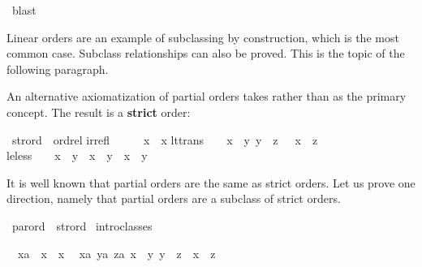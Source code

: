 \begin{isabellebody}
\ blast\isanewline
{}\isamarkupfalse%
%
\endisatagproof
{\isafoldproof}%
%
\isadelimproof
%
\endisadelimproof
%
\begin{isamarkuptext}%
Linear orders are an example of subclassing
by construction, which is the most
common case.  Subclass relationships can also be proved.  
This is the topic of the following
paragraph.%
\end{isamarkuptext}%
\isamarkuptrue%
%
\isamarkuptrue%
%
\begin{isamarkuptext}%
An alternative axiomatization of partial orders takes \isa{{\isacharless}{\isacharless}} rather than
\isa{{\isacharless}{\isacharless}{\isacharequal}} as the primary concept. The result is a \textbf{strict} order:%
\end{isamarkuptext}%
\isamarkuptrue%
\isamarkupfalse%
\ strord\ {\isacharless}\ ordrel\isanewline
irrefl{\isacharcolon}\ \ \ \ \ {\isachardoublequoteopen}{\isasymnot}\ x\ {\isacharless}{\isacharless}\ x{\isachardoublequoteclose}\isanewline
lt{\isacharunderscore}trans{\isacharcolon}\ \ \ {\isachardoublequoteopen}{\isasymlbrakk}\ x\ {\isacharless}{\isacharless}\ y{\isacharsemicolon}\ y\ {\isacharless}{\isacharless}\ z\ {\isasymrbrakk}\ {\isasymLongrightarrow}\ x\ {\isacharless}{\isacharless}\ z{\isachardoublequoteclose}\isanewline
le{\isacharunderscore}less{\isacharcolon}\ \ \ \ {\isachardoublequoteopen}x\ {\isacharless}{\isacharless}{\isacharequal}\ y\ {\isacharequal}\ {\isacharparenleft}x\ {\isacharless}{\isacharless}\ y\ {\isasymor}\ x\ {\isacharequal}\ y{\isacharparenright}{\isachardoublequoteclose}%
\begin{isamarkuptext}%
\noindent
It is well known that partial orders are the same as strict orders. Let us
prove one direction, namely that partial orders are a subclass of strict
orders.%
\end{isamarkuptext}%
\isamarkuptrue%
\isamarkupfalse%
\ parord\ {\isacharless}\ strord\isanewline
%
\isadelimproof
%
\endisadelimproof
%
\isatagproof
{}\isamarkupfalse%
\ intro{\isacharunderscore}classes%
\begin{isamarkuptxt}%
\noindent
\begin{isabelle}%
\ {}{\isachardot}\ {\isasymAnd}x{\isasymColon}{\isacharprime}a{\isachardot}\ {\isasymnot}\ x\ {\isacharless}{\isacharless}\ x\isanewline
\ {}{\isachardot}\ {\isasymAnd}{\isacharparenleft}x{\isasymColon}{\isacharprime}a{\isacharparenright}\ {\isacharparenleft}y{\isasymColon}{\isacharprime}a{\isacharparenright}\ z{\isasymColon}{\isacharprime}a{\isachardot}\ {\isasymlbrakk}x\ {\isacharless}{\isacharless}\ y{\isacharsemicolon}\ y\ {\isacharless}{\isacharless}\ z{\isasymrbrakk}\ {\isasymLongrightarrow}\ x\ {\isacharless}{\isacharless}\ z\isanewline

\end{isabelle}
\end{isamarkuptxt}
\end{isabellebody}
